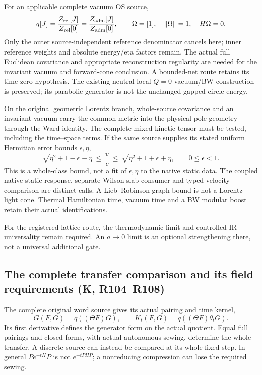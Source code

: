 For an applicable complete vacuum OS source,
\[
 q[J]=\frac{Z_{\rm rel}[J]}{Z_{\rm rel}[0]}
     =\frac{Z_{\rm adm}[J]}{Z_{\rm adm}[0]},\qquad
 \Omega=[1],\quad \|\Omega\|=1,\quad H\Omega=0.
\]
Only the outer source-independent reference denominator cancels here;
inner reference weights and absolute energy/eta factors remain.
The actual full Euclidean covariance and appropriate reconstruction
regularity are needed for the invariant vacuum and forward-cone
conclusion. A bounded-net route retains its time-zero hypothesis.
The existing neutral local $Q=0$ vacuum/BW construction is preserved;
its parabolic generator is not the unchanged gapped circle energy.

On the original geometric Lorentz branch, whole-source covariance and
an invariant vacuum carry the common metric into the physical pole
geometry through the Ward identity. The complete mixed kinetic tensor
must be tested, including the time--space terms. If the same source
supplies its stated uniform Hermitian error bounds $\epsilon,\eta$,
\[
 \sqrt{\eta^2+1-\epsilon}-\eta
 \ \leq\ \frac vc\ \leq\
 \sqrt{\eta^2+1+\epsilon}+\eta,\qquad 0\leq\epsilon<1.
\]
This is a whole-class bound, not a fit of $\epsilon,\eta$ to the native
static data. The coupled native static response, separate Wilson-slab
consumer and typed velocity comparison are distinct calls. A
Lieb--Robinson graph bound is not a Lorentz light cone. Thermal
Hamiltonian time, vacuum time and a BW modular boost retain their
actual identifications.

For the registered lattice route, the thermodynamic limit and
controlled IR universality remain required. An $a\to0$ limit is an
optional strengthening there, not a universal additional gate.

\subsection*{The complete transfer comparison and its field requirements (K, R104--R108)}

The complete original word source gives its actual pairing and time
kernel,
\[
 G(F,G)=q((\Theta F)G),\qquad
 K_t(F,G)=q((\Theta F)\theta_tG).
\]
Its first derivative defines the generator form on the actual quotient.
Equal full pairings and closed forms, with actual autonomous sewing,
determine the whole transfer. A discrete source can instead be compared
at its whole fixed step. In general
$Pe^{-tH}P$ is not $e^{-tPHP}$; a nonreducing compression can lose the
required sewing.

